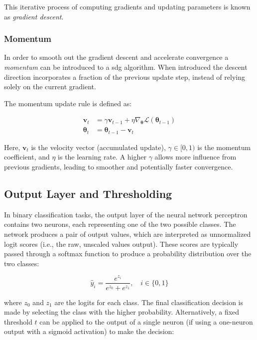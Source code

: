 \documentclass{pracalicmgr}
\begin{document}
This iterative process of computing gradients and updating parameters is known as \textit{gradient descent}.

\subsubsection{Momentum}

In order to smooth out the gradient descent and accelerate convergence a \textit{momentum} can be introduced to a sdg algorithm. When introduced the descent direction incorporates a fraction of the previous update step, instead of relying solely on the current gradient.

The momentum update rule is defined as:

\[
\begin{aligned}
\mathbf{v}_t &= \gamma \mathbf{v}_{t-1} + \eta \nabla_{\boldsymbol{\theta}} \mathcal{L}(\boldsymbol{\theta}_{t-1}) \\
\boldsymbol{\theta}_t &= \boldsymbol{\theta}_{t-1} - \mathbf{v}_t
\end{aligned}
\]

Here, \( \mathbf{v}_t \) is the velocity vector (accumulated update), \( \gamma \in [0,1) \) is the momentum coefficient, and \( \eta \) is the learning rate. A higher \( \gamma \) allows more influence from previous gradients, leading to smoother and potentially faster convergence.

\subsection{Output Layer and Thresholding}

In binary classification tasks, the output layer of the neural network perceptron contains two neurons, each representing one of the two possible classes. The network produces a pair of output values, which are interpreted as unnormalized logit scores (i.e., the raw, unscaled values output). These scores are typically passed through a softmax function to produce a probability distribution over the two classes:

\[
\hat{y}_i = \frac{e^{z_i}}{e^{z_0} + e^{z_1}}, \quad i \in \{0, 1\}
\]

where \( z_0 \) and \( z_1 \) are the logits for each class. The final classification decision is made by selecting the class with the higher probability. Alternatively, a fixed threshold $t$ can be applied to the output of a single neuron (if using a one-neuron output with a sigmoid activation) to make the decision:
\end{document}
